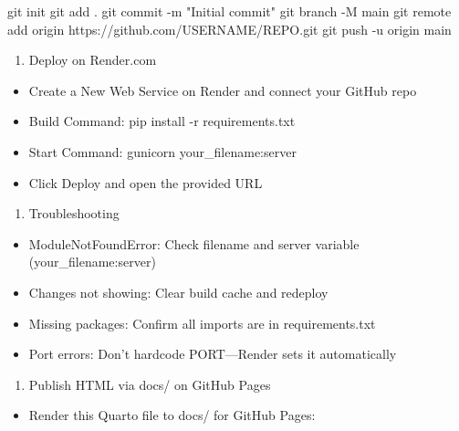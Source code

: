 \documentclass[
  letterpaper,
  DIV=11,
  numbers=noendperiod]{scrreprt}
\newenvironment{Shaded}{\begin{snugshade}}{\end{snugshade}}
\newcommand{\NormalTok}[1]{\textcolor[rgb]{0.00,0.23,0.31}{#1}}
\providecommand{\tightlist}{%
  \setlength{\itemsep}{0pt}\setlength{\parskip}{0pt}}\usepackage{longtable,booktabs,array}
\begin{document}
\begin{Shaded}
\begin{Highlighting}[]
\NormalTok{git init}
\NormalTok{git add .}
\NormalTok{git commit {-}m "Initial commit"}
\NormalTok{git branch {-}M main}
\NormalTok{git remote add origin https://github.com/USERNAME/REPO.git}
\NormalTok{git push {-}u origin main}
\end{Highlighting}
\end{Shaded}

\begin{enumerate}
\def\labelenumi{\arabic{enumi})}
\setcounter{enumi}{4}
\tightlist
\item
  Deploy on Render.com
\end{enumerate}

\begin{itemize}
\tightlist
\item
  Create a New Web Service on Render and connect your GitHub repo
\item
  Build Command: pip install -r requirements.txt
\item
  Start Command: gunicorn your\_filename:server
\item
  Click Deploy and open the provided URL
\end{itemize}

\begin{enumerate}
\def\labelenumi{\arabic{enumi})}
\setcounter{enumi}{5}
\tightlist
\item
  Troubleshooting
\end{enumerate}

\begin{itemize}
\tightlist
\item
  ModuleNotFoundError: Check filename and server variable
  (your\_filename:server)
\item
  Changes not showing: Clear build cache and redeploy
\item
  Missing packages: Confirm all imports are in requirements.txt
\item
  Port errors: Don't hardcode PORT---Render sets it automatically
\end{itemize}

\begin{enumerate}
\def\labelenumi{\arabic{enumi})}
\setcounter{enumi}{6}
\tightlist
\item
  Publish HTML via docs/ on GitHub Pages
\end{enumerate}

\begin{itemize}
\tightlist
\item
  Render this Quarto file to docs/ for GitHub Pages:
\end{itemize}
\end{document}
